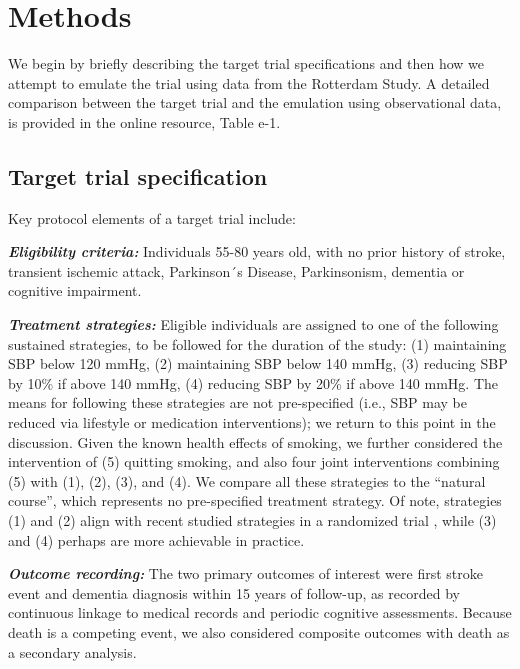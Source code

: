 \documentclass[
]{book}
\begin{document}
\hypertarget{methods-1}{%
\section{Methods}\label{methods-1}}

We begin by briefly describing the target trial specifications and then how we attempt to emulate the trial using data from the Rotterdam Study. A detailed comparison between the target trial and the emulation using observational data, is provided in the online resource, Table e-1.

\hypertarget{target-trial-specification}{%
\subsection{Target trial specification}\label{target-trial-specification}}

Key protocol elements of a target trial include:

\textbf{\emph{Eligibility criteria:}} Individuals 55-80 years old, with no prior history of stroke, transient ischemic attack, Parkinson´s Disease, Parkinsonism, dementia or cognitive impairment.

\textbf{\emph{Treatment strategies:}} Eligible individuals are assigned to one of the following sustained strategies, to be followed for the duration of the study: (1) maintaining SBP below 120 mmHg, (2) maintaining SBP below 140 mmHg, (3) reducing SBP by 10\% if above 140 mmHg, (4) reducing SBP by 20\% if above 140 mmHg. The means for following these strategies are not pre-specified (i.e., SBP may be reduced via lifestyle or medication interventions); we return to this point in the discussion. Given the known health effects of smoking, we further considered the intervention of (5) quitting smoking, and also four joint interventions combining (5) with (1), (2), (3), and (4). We compare all these strategies to the ``natural course'', which represents no pre-specified treatment strategy. Of note, strategies (1) and (2) align with recent studied strategies in a randomized trial \autocite{williamson2019}, while (3) and (4) perhaps are more achievable in practice.

\textbf{\emph{Outcome recording:}} The two primary outcomes of interest were first stroke event and dementia diagnosis within 15 years of follow-up, as recorded by continuous linkage to medical records and periodic cognitive assessments. Because death is a competing event, we also considered composite outcomes with death as a secondary analysis.
\end{document}
